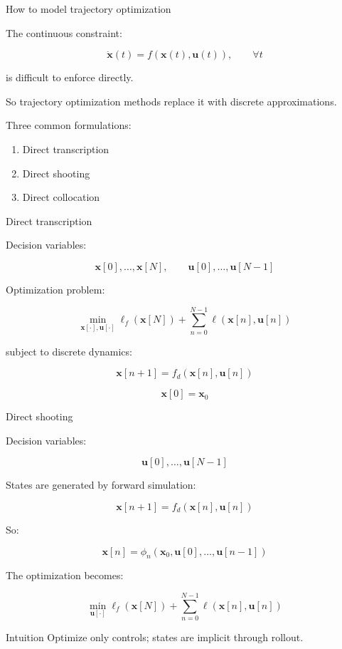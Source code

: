 \documentclass[aspectratio=169]{beamer}
\begin{document}
\begin{frame}{How to model trajectory optimization}
\large

The continuous constraint:

\[
\dot{\bm{x}}(t)
=
f(\bm{x}(t),\bm{u}(t)),
\qquad
\forall t
\]

is difficult to enforce directly.

\vspace{0.4cm}

So trajectory optimization methods replace it with discrete approximations.

\vspace{0.3cm}

Three common formulations:

\begin{enumerate}
    \item Direct transcription
    \item Direct shooting
    \item Direct collocation
\end{enumerate}

\end{frame}

\begin{frame}{Direct transcription}

Decision variables:

\[
\bm{x}[0],\ldots,\bm{x}[N],
\qquad
\bm{u}[0],\ldots,\bm{u}[N-1]
\]

Optimization problem:

\[
\min_{\bm{x}[\cdot],\bm{u}[\cdot]}
\ell_f(\bm{x}[N])
+
\sum_{n=0}^{N-1}
\ell(\bm{x}[n],\bm{u}[n])
\]

subject to discrete dynamics:

\[
\bm{x}[n+1]
=
f_d(\bm{x}[n],\bm{u}[n])
\]

\[
\bm{x}[0]=\bm{x}_0
\]

\vspace{0.3cm}


\end{frame}

\begin{frame}{Direct shooting}
\large

Decision variables:

\[
\bm{u}[0],\ldots,\bm{u}[N-1]
\]

States are generated by forward simulation:

\[
\bm{x}[n+1]
=
f_d(\bm{x}[n],\bm{u}[n])
\]

So:

\[
\bm{x}[n]
=
\phi_n(\bm{x}_0,\bm{u}[0],\ldots,\bm{u}[n-1])
\]

The optimization becomes:

\[
\min_{\bm{u}[\cdot]}
\ell_f(\bm{x}[N])
+
\sum_{n=0}^{N-1}
\ell(\bm{x}[n],\bm{u}[n])
\]

\vspace{0.3cm}

\begin{block}{Intuition}
Optimize only controls; states are implicit through rollout.
\end{block}

\end{frame}
\end{document}
